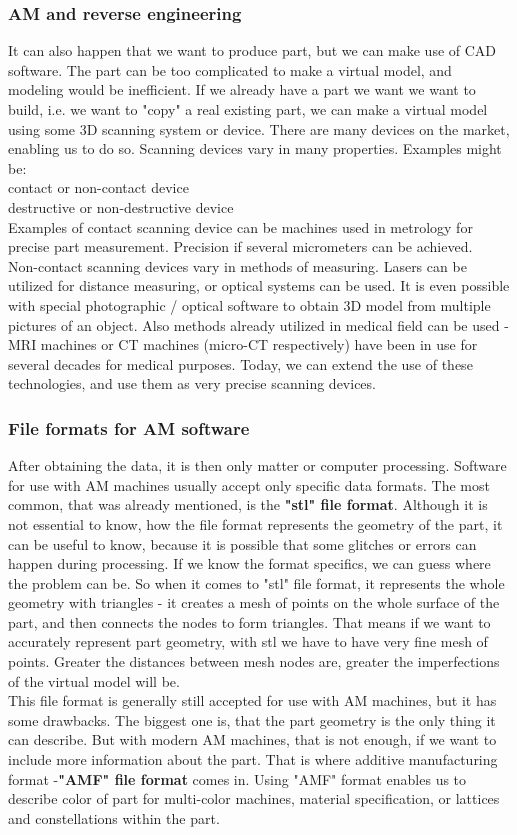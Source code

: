\documentclass[a4paper]{report}
\begin{document}
\subsubsection{AM and reverse engineering}
It can also happen that we want to produce part, but we can make use of CAD software. The part can be too complicated to make a virtual model, and modeling would be inefficient. If we already have a part we want we want to build, i.e. we want to "copy" a real existing part, we can make a virtual model using some 3D scanning system or device. There are many devices on the market, enabling us to do so. Scanning devices vary in many properties. Examples might be:\\
contact or non-contact device\\
destructive or non-destructive device\\
Examples of contact scanning device can be machines used in metrology for precise part measurement. Precision if several micrometers can be achieved.\\
Non-contact scanning devices vary in methods of measuring. Lasers can be utilized for distance measuring, or optical systems can be used. It is even possible with special photographic / optical software to obtain 3D model from multiple pictures of an object. Also methods already utilized in medical field can be used - MRI machines or CT machines (micro-CT respectively) have been in use for several decades for medical purposes. Today, we can extend the use of these technologies, and use them as very precise scanning devices.
\subsubsection{File formats for AM software}
After obtaining the data, it is then only matter or computer processing. Software for use with AM machines usually accept only specific data formats. The most common, that was already mentioned, is the \textbf{"stl" file format}. Although it is not essential to know, how the file format represents the geometry of the part, it can be useful to know, because it is possible that some glitches or errors can happen during processing. If we know the format specifics, we can guess where the problem can be. So when it comes to "stl" file format, it represents the whole geometry with triangles - it creates a mesh of points on the whole surface of the part, and then connects the nodes to form triangles. That means if we want to accurately represent part geometry, with stl we have to have very fine mesh of points. Greater the distances between mesh nodes are, greater the imperfections of the virtual model will be.\\
This file format is generally still accepted for use with AM machines, but it has some drawbacks. The biggest one is, that the part geometry is the only thing it can describe. But with modern AM machines, that is not enough, if we want to include more information about the part. That is where additive manufacturing format -\textbf{"AMF" file format} comes in. Using "AMF" format enables us to describe color of part for multi-color machines, material specification, or lattices and constellations within the part.
\end{document}
